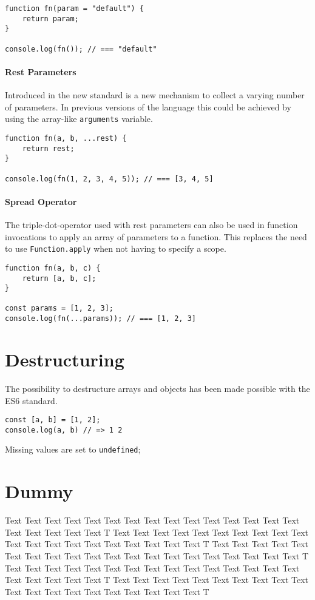 \documentclass{bioinfo}
\begin{document}
\begin{lstlisting}
function fn(param = "default") {
    return param;
}

console.log(fn()); // === "default"
\end{lstlisting}

\paragraph{Rest Parameters}
Introduced in the new standard is a new mechanism to collect a varying number of parameters.
In previous versions of the language this could be achieved by using the array-like
{\tt arguments} variable.

\begin{lstlisting}
function fn(a, b, ...rest) {
    return rest;
}

console.log(fn(1, 2, 3, 4, 5)); // === [3, 4, 5]
\end{lstlisting}

\paragraph{Spread Operator}
The triple-dot-operator used with rest parameters can also be used in function invocations
to apply an array of parameters to a function. This replaces the need to use {\tt Function.apply}
when not having to specify a scope.

\begin{lstlisting}
function fn(a, b, c) {
    return [a, b, c];
}

const params = [1, 2, 3];
console.log(fn(...params)); // === [1, 2, 3]
\end{lstlisting}

\section{Destructuring}
The possibility to destructure arrays and objects has been made possible with
the ES6 standard.

\begin{lstlisting}
const [a, b] = [1, 2];
console.log(a, b) // => 1 2
\end{lstlisting}

Missing values are set to {\tt undefined}; 
\section{Dummy}
Text Text Text Text Text Text  Text Text Text Text Text Text Text Text Text  Text Text Text Text Text T
Text Text Text Text Text Text  Text Text Text Text Text Text Text Text Text  Text Text Text Text Text T
Text Text Text Text Text Text  Text Text Text Text Text Text Text Text Text  Text Text Text Text Text T
Text Text Text Text Text Text  Text Text Text Text Text Text Text Text Text  Text Text Text Text Text T
Text Text Text Text Text Text  Text Text Text Text Text Text Text Text Text  Text Text Text Text Text T
\end{document}
